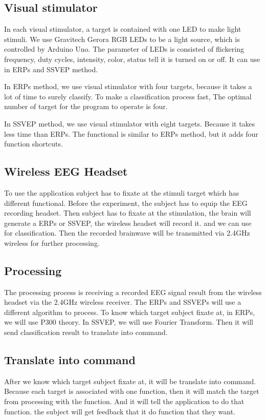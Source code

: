 \subsection{Visual stimulator}

\hspace{1.5cm}In each visual stimulator, a target is contained with one LED to make light stimuli. We use Gravitech Gerora RGB LEDs to be a light source, which is controlled by Arduino Uno.  The parameter of LEDs is consisted of flickering frequency, duty cycles, intensity, color, status tell it is turned on or off. It can use in ERPs and SSVEP method. 

In ERPs method, we use visual stimulator with four targets, because it takes a lot of time to surely classify. To make a classification process fast, The optimal number of target for the program to operate is four.

In SSVEP method, we use visual stimulator with eight targets. Because it takes less time than ERPs. The functional is similar to ERPs method, but it adds four function shortcuts.

\subsection{Wireless EEG Headset}
\hspace{1.5cm}To use the application subject has to fixate at the stimuli target which has different functional. Before the experiment, the subject has to equip the EEG recording headset. Then subject has to fixate at the stimulation, the brain will generate a ERPs or SSVEP, the wireless headset will record it. and we can use for classification. Then the recorded brainwave will be transmitted via 2.4GHz wireless for further processing.

\subsection{Processing}
\hspace{1.5cm}The processing process is receiving a recorded EEG signal result from the wireless headset via the 2.4GHz wireless receiver. The ERPs and SSVEPs will use a different algorithm to process. To know which target subject fixate at, in ERPs, we will use P300 theory. In SSVEP, we will use Fourier Transform. Then it will send classification result to translate into command.

\subsection{Translate into command}
\hspace{1.5cm} After we know which target subject fixate at, it will be translate into command. Because each target is associated with one function, then it will match the target from processing with the function. And it will tell the application to do that function. the subject will get feedback that it do function that they want.

